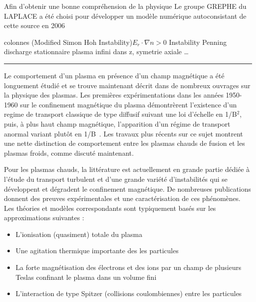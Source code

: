 \begin{refsection}
 Afin d'obtenir une bonne
compréhension de la physique Le groupe GREPHE du LAPLACE a été choisi pour développer un modèle numérique autoconsistant de cette source en 2006

colonnes
\parencite{RosenbluthSimon}
\parencite{Sakawa} (Modified Simon Hoh Instability)$E_r\cdot\nabla n > 0$
\parencite{Hoh} Instability Penning discharge
\parencite{Fruchtman} stationnaire
\parencite{Sternberg} plasma infini dans z, symetrie axiale \ldots 

\parencite{Rosenbluth}\parencite{Chandrasekhar}
\begin{center}
\rule{0.6\textwidth}{1pt}
\end{center}

Le comportement d'un plasma en présence d'un champ magnétique a été
longuement étudié et se trouve maintenant décrit dans de nombreux ouvrages sur
la physique des plasmas.
Les premières expérimentations dans les années 1950-1960 sur le confinement
magnétique du plasma démontrèrent l'existence d'un regime de transport classique
de type diffusif suivant une loi d'échelle en 1/B$^2$, puis, à plus haut champ
magnétique, l'apparition d'un régime de transport anormal variant plutôt en
1/B~\parencite{Bohm,Simon55,Yoshikawa,Janes,Rozhansky}. Les travaux plus
récents sur ce sujet montrent une nette distinction de
comportement entre les plasmas chauds de fusion et les plasmas froids, comme
discuté maintenant.

Pour les plasmas chauds, la littérature est actuellement en grande partie dédiée
à l'étude du transport turbulent et d'une grande variété d'instabilités qui
se développent et dégradent le confinement magnétique. De nombreuses
publications donnent des preuves expérimentales et une caractérisation de ces
phénomènes. Les théories et modèles correspondants sont typiquement basés sur
les approximations suivantes :

\begin{itemize}
  \item L'ionisation (quasiment) totale du plasma
  \item Une agitation thermique importante des les particules
  \item La forte magnétisation des électrons et des ions par un champ de
  plusieurs Teslas confinant le plasma dans un volume fini
  \item L'interaction de type Spitzer (collisions coulombiennes) entre les
  particules
\end{itemize}


\end{refsection}
